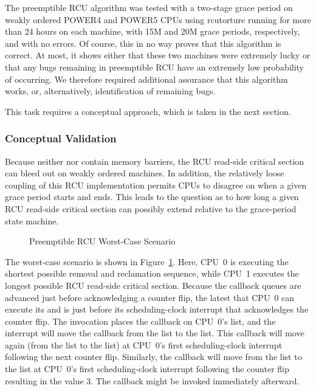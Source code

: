 The preemptible RCU algorithm was tested with a two-stage grace period
on weakly ordered POWER4 and POWER5 CPUs using rcutorture running for
more than 24 hours on each machine, with 15M and 20M grace periods,
respectively, and with no errors.
Of course, this in no way proves that this algorithm is correct.
At most, it shows either that these two machines were extremely
lucky or that any bugs remaining in preemptible RCU have an extremely
low probability of occurring.
We therefore required additional assurance that this algorithm works,
or, alternatively, identification of remaining bugs.

This task requires a conceptual approach,
which is taken in the next section.
\fi

\subsubsection{Conceptual Validation}
\label{app:rcuimpl:Conceptual Validation}

Because neither  nor 
contain memory barriers, the RCU read-side critical section can bleed
out on weakly ordered machines.
In addition, the relatively loose coupling of this RCU implementation
permits CPUs to disagree on when a given grace period starts and ends.
This leads to the question as to how long a given RCU read-side critical
section can possibly extend relative to the grace-period state machine.

\begin{figure}[htb]
\centering
{}
\caption{Preemptible RCU Worst-Case Scenario}
\label{app:rcuimpl:Preemptible RCU Worst-Case Scenario}
\end{figure}

The worst-case scenario is shown in
Figure~\ref{app:rcuimpl:Preemptible RCU Worst-Case Scenario}.
Here, CPU~0 is executing the shortest possible
removal and reclamation sequence,
while CPU~1 executes the longest possible RCU read-side critical
section.
Because the callback queues are advanced just before acknowledging a
counter flip, the latest that CPU~0 can execute its
 and  is just before
its scheduling-clock interrupt that acknowledges the counter flip.
The  invocation places the callback on CPU~0's
 list, and the interrupt will move the callback from
the  list to the  list.
This callback will move again (from the  list
to the  list) at CPU~0's first scheduling-clock
interrupt following the next counter flip.
Similarly, the callback will move from the  list
to the  list at CPU~0's first scheduling-clock
interrupt following the counter flip resulting in the value 3.
The callback might be invoked immediately afterward.


